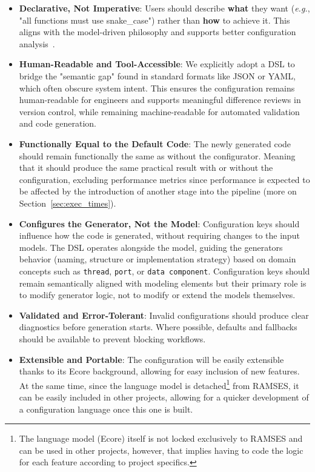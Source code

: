 \begin{itemize}
	\item \textbf{Declarative, Not Imperative}: Users should describe \textbf{what} they want (\textit{e.g.}, "all functions must use snake\_case") rather than \textbf{how} to achieve it. This aligns with the model-driven philosophy and supports better configuration analysis~\cite{Schmidt_DC_2006}.
	\item \textbf{Human-Readable and Tool-Accessible}: We explicitly adopt a \gls{DSL} to bridge the "semantic gap" found in standard formats like \gls{JSON} or \gls{YAML}, which often obscure system intent. This ensures the configuration remains human-readable for engineers and supports meaningful difference reviews in version control, while remaining machine-readable for automated validation and code generation.
	\item \textbf{Functionally Equal to the Default Code}: The newly generated code should remain functionally the same as without the configurator. Meaning that it should produce the same practical result with or without the configuration, excluding performance metrics since performance is expected to be affected by the introduction of another stage into the pipeline (more on Section~\ref{sec:exec_times}).
	\item \textbf{Configures the Generator, Not the Model}: Configuration keys should influence how the code is generated, without requiring changes to the input models. The \gls{DSL} operates alongside the model, guiding the generators behavior (naming, structure or implementation strategy) based on domain concepts such as \texttt{thread}, \texttt{port}, or \texttt{data component}. Configuration keys should remain semantically aligned with modeling elements but their primary role is to modify generator logic, not to modify or extend the models themselves.
	\item \textbf{Validated and Error-Tolerant}: Invalid configurations should produce clear diagnostics before generation starts. Where possible, defaults and fallbacks should be available to prevent blocking workflows.
	\item \textbf{Extensible and Portable}: The configuration will be easily extensible thanks to its Ecore background, allowing for easy inclusion of new features. At the same time, since the language model is detached\footnote{The language model (Ecore) itself is not locked exclusively to \gls{RAMSES} and can be used in other projects, however, that implies having to code the logic for each feature according to project specifics.} from \gls{RAMSES}, it can be easily included in other projects, allowing for a quicker development of a configuration language once this one is built.
\end{itemize}

